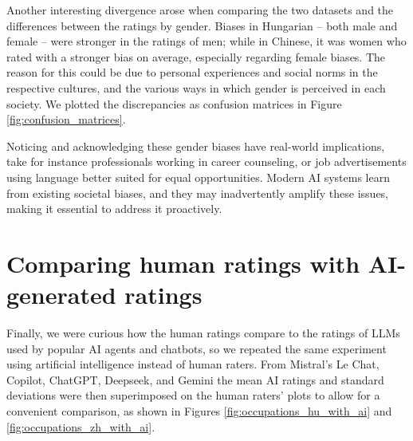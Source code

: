 \documentclass[11pt]{article}
\begin{document}
Another interesting divergence arose when comparing the two datasets and the differences between the ratings by gender. Biases in Hungarian -- both male and female -- were stronger in the ratings of men; while in Chinese, it was women who rated with a stronger bias on average, especially regarding female biases. The reason for this could be due to personal experiences and social norms in the respective cultures, and the various ways in which gender is perceived in each society. We plotted the discrepancies as confusion matrices in Figure \ref{fig:confusion_matrices}.



Noticing and acknowledging these gender biases have real-world implications, take for instance professionals working in career counseling, or job advertisements using language better suited for equal opportunities. Modern AI systems learn from existing societal biases, and they may inadvertently amplify these issues, making it essential to address it proactively.

\section{Comparing human ratings with AI-generated ratings}
\label{sec:ai_comparison}

Finally, we were curious how the human ratings compare to the ratings of LLMs used by popular AI agents and chatbots, so we repeated the same experiment using artificial intelligence instead of human raters. From Mistral's Le Chat, Copilot, ChatGPT, Deepseek, and Gemini the mean AI ratings and standard deviations were then superimposed on the human raters' plots to allow for a convenient comparison, as shown in Figures \ref{fig:occupations_hu_with_ai} and \ref{fig:occupations_zh_with_ai}.
\end{document}
